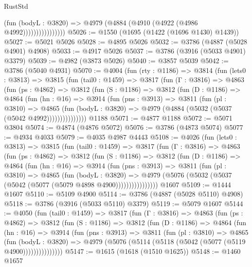 \begin{lexlean}{RustStd}
\begin{coremodule}
                          (fun (bodyL : @3820) =>
                          @4979 (@4884 (@4910 (@4922 (@4986 @4992))))))))))))))))
@5026 := @1550 (@1695 (@1422 (@1696 @1430) @1439))
@5027 := @5021 @5026
@5028 := @4895 @5026
@5032 := @3786 (@4887 (@5028 @4901) @4908)
@5033 := @4917 @5026
@5037 := @3786 (@3916 (@5033 @4901) @3379)
@5039 := @4982 (@3873 @5026)
@5040 := @3857 @5039
@5042 := @3786 (@5040 @4931)
@5070 := @4004
    (fun (rty : @1186) =>
    @3814
      (fun (lets0 : @3813) =>
      @3815
        (fun (tail0 : @1459) =>
        @3817
          (fun (Γ : @3816) =>
          @4863
            (fun (ps : @4862) =>
            @3812
              (fun (S : @1186) =>
              @3812
                (fun (D : @1186) =>
                @4864
                  (fun (hn : @16) =>
                  @3914
                    (fun (pns : @3913) =>
                    @3811
                      (fun (pl : @3810) =>
                      @4865
                        (fun (bodyL : @3820) =>
                        @4979 (@4884 (@5032 (@5037 (@5042 @4992)))))))))))))))
    @1188
@5071 := @4877 @1188
@5072 := @5071 @3804
@5074 := @4874 (@4876 @5072)
@5076 := @3786 (@4873 @5074)
@5077 := @4934 @4033
@5079 := @4035 @4987 @4443
@5108 := @4026
    (fun (lets0 : @3813) =>
    @3815
      (fun (tail0 : @1459) =>
      @3817
        (fun (Γ : @3816) =>
        @4863
          (fun (ps : @4862) =>
          @3812
            (fun (S : @1186) =>
            @3812
              (fun (D : @1186) =>
              @4864
                (fun (hn : @16) =>
                @3914
                  (fun (pns : @3913) =>
                  @3811
                    (fun (pl : @3810) =>
                    @4865
                      (fun (bodyL : @3820) =>
                      @4979 (@5076 (@5032 (@5037 (@5042 (@5077 (@5079 @4898 @4900))))))))))))))))
    @1607
@5109 := @1444 @1607
@5110 := @5109 @4900
@5114 := @3786 (@4887 (@5028 @5110) @4908)
@5118 := @3786 (@3916 (@5033 @5110) @3379)
@5119 := @5079 @1607
@5144 := @4050
    (fun (tail0 : @1459) =>
    @3817
      (fun (Γ : @3816) =>
      @4863
        (fun (ps : @4862) =>
        @3812
          (fun (S : @1186) =>
          @3812
            (fun (D : @1186) =>
            @4864
              (fun (hn : @16) =>
              @3914
                (fun (pns : @3913) =>
                @3811
                  (fun (pl : @3810) =>
                  @4865
                    (fun (bodyL : @3820) =>
                    @4979 (@5076 (@5114 (@5118 (@5042 (@5077 (@5119 @4900)))))))))))))))
@5147 := @1615 (@1618 (@1510 @1625))
@5148 := @1460 @1657

\end{coremodule}
\end{lexlean}
